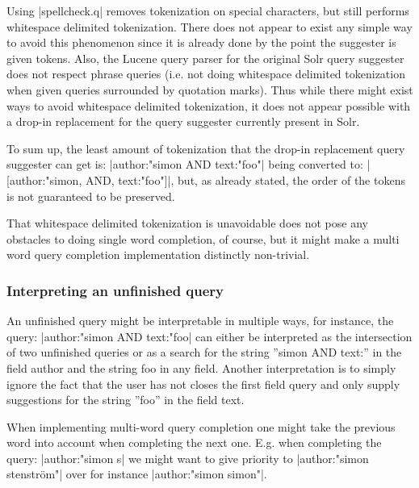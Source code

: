 Using |spellcheck.q| removes tokenization on special characters, but still performs whitespace delimited tokenization. There does not appear to exist any simple way to avoid this phenomenon since it is already done by the point the suggester is given tokens. Also, the Lucene query parser for the original Solr query suggester does not respect phrase queries (i.e. not doing whitespace delimited tokenization when given queries surrounded by quotation marks). Thus while there might exist ways to avoid whitespace delimited tokenization, it does not appear possible with a drop-in replacement for the query suggester currently present in Solr.

To sum up, the least amount of tokenization that the drop-in replacement query suggester can get is: |author:"simon AND text:"foo"| being converted to: |[author:"simon, AND, text:"foo"]|, but, as already stated, the order of the tokens is not guaranteed to be preserved.

That whitespace delimited tokenization is unavoidable does not pose any obstacles to doing single word completion, of course, but it might make a multi word query completion implementation distinctly non-trivial. 

\subsubsection{Interpreting an unfinished query}

An unfinished query might be interpretable in multiple ways, for instance, the query: |author:"simon AND text:"foo| can either be interpreted as the intersection of two unfinished queries or as a search for the string ''simon AND text:'' in the field author and the string foo in any field. Another interpretation is to simply ignore the fact that the user has not closes the first field query and only supply suggestions for the string ''foo'' in the field text. 

When implementing multi-word query completion one might take the previous word into account when completing the next one. E.g. when completing the query: |author:"simon s| we might want to give priority to |author:"simon stenström"| over for instance |author:"simon simon"|.

